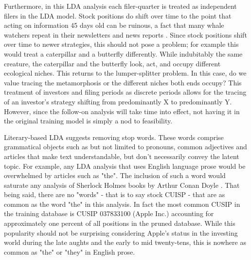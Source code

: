 Furthermore, in this LDA analysis each filer-quarter is treated as independent filers in the LDA model. Stock positions do shift over time to the point that acting on information 45 days old can be ruinous, a fact that many whale watchers repeat in their newsletters and news reports \citep{Whale_Watching_CNBC_12,cramerwhale}. Since stock positions shift over time to newer strategies, this should not pose a problem; for example this would treat a caterpillar and a butterfly differently.  While indubitably the same creature, the caterpillar and the butterfly look, act, and occupy different ecological niches.  This returns to the lumper-splitter problem. In this case, do we value tracing the metamorphosis or the different niches both ends occupy?  This treatment of investors and filing periods as discrete periods allows for the tracing of an investor's strategy shifting from predominantly X to predominantly Y.  However, since the follow-on analysis will take time into effect, not having it in the original training model is simply a nod to feasibility. 

Literary-based LDA suggests removing stop words.  These words comprise grammatical objects such as but not limited to pronouns, common adjectives and articles that make text understandable, but don't necessarily convey the latent topic. For example, any LDA analysis that uses English language prose would be overwhelmed by articles such as "the". The inclusion of such a word would saturate any analysis of Sherlock Holmes books by Arthur Conan Doyle \citep{Silge2018}.  That being said, there are no "words" - that is to say stock CUISP - that are as common as the word "the" in this analysis.  In fact the most common CUSIP in the training database is CUSIP 037833100 (Apple Inc.) accounting for approximately one percent of all positions in the pruned database. While this popularity should not be surprising considering Apple's status in the investing world during the late aughts and the early to mid twenty-tens, this is nowhere as common as "the" or "they" in English prose.   

